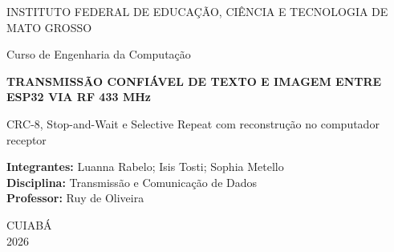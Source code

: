 \documentclass[12pt,a4paper]{article}
\begin{document}
\begin{titlepage}
\begin{center}
{\large INSTITUTO FEDERAL DE EDUCAÇÃO, CIÊNCIA E TECNOLOGIA DE MATO GROSSO\par}
\vspace{0.3cm}
{\large Curso de Engenharia da Computação\par}
\vfill
{\LARGE\bfseries TRANSMISSÃO CONFIÁVEL DE TEXTO E IMAGEM ENTRE ESP32 VIA RF 433 MHz\par}
\vspace{0.5cm}
{\large CRC-8, Stop-and-Wait e Selective Repeat com reconstrução no computador receptor\par}
\vfill
\begin{flushleft}
\textbf{Integrantes:} Luanna Rabelo; Isis Tosti; Sophia Metello\\
\textbf{Disciplina:} Transmissão e Comunicação de Dados\\
\textbf{Professor:} Ruy de Oliveira
\end{flushleft}
\vfill
CUIABÁ\\2026
\end{center}
\end{titlepage}

\begin{abstract}
Este trabalho apresenta um enlace entre duas placas ESP32 e dois computadores, com quatro módulos de radiofrequência de 433 MHz: um transmissor e um receptor em cada placa. O computador A envia texto ou uma imagem escolhida por caminho de arquivo; o ESP32 A transmite quadros pelo rádio; o ESP32 B confirma o recebimento pelo caminho reverso; e o computador B salva o objeto reconstruído. O OLED da placa B exibe texto e sinaliza a chegada de imagem. O protocolo usa codificação Manchester, quadros de até 21 bytes, CRC-8 para detectar quadros alterados, CRC-32 para conferir o objeto completo e duas alternativas de retransmissão: Stop-and-Wait e Selective Repeat com janela de quatro quadros. Foram auditados 37 logs locais, que incluem entregas de texto e imagem, dois ensaios de corrupção proposital com detecção de FCS e recuperação, além de tentativas interrompidas, perda de ACK e falhas de acesso à porta serial. Uma fotografia documenta o arranjo usado à distância estimada pelo grupo em 0,8 a 1,0 m. O requisito estrito de distância superior a 1 m e a avaliação com interferência externa controlada ainda exigem ensaios específicos.

\noindent\textbf{Palavras-chave:} ESP32; RF 433 MHz; CRC; ARQ; Manchester; imagem.
\end{abstract}
\tableofcontents
\newpage
\end{document}
